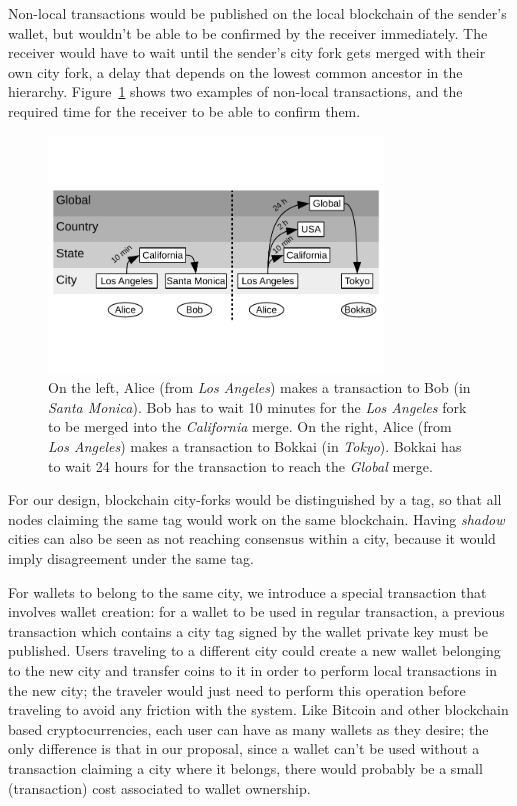 Non-local transactions would be published on the local blockchain of the
sender's wallet, but wouldn't be able to be confirmed by the receiver
immediately.  The receiver would have to wait until the sender's city fork gets
merged with their own city fork, a delay that depends on the lowest common
ancestor in the hierarchy.  Figure~\ref{fig:non-local-tx} shows two examples of
non-local transactions, and the required time for the receiver to be able to
confirm them.

\begin{figure}
\includegraphics[trim={0 0.8in 0 0.4in},clip,width=3.5in]{non-local-tx}
\caption{On the left, Alice (from \textit{Los Angeles}) makes a transaction to
Bob (in \textit{Santa Monica}).  Bob has to wait 10 minutes for the \textit{Los
Angeles} fork to be merged into the \textit{California} merge.  On the right,
Alice (from \textit{Los Angeles}) makes a transaction to Bokkai (in
\textit{Tokyo}).  Bokkai has to wait 24 hours for the transaction to reach the
\textit{Global} merge.}
\label{fig:non-local-tx}
\end{figure}

For our design, blockchain city-forks would be distinguished by a tag, so that
all nodes claiming the same tag would work on the same blockchain.  Having
\textit{shadow} cities can also be seen as not reaching consensus within a city,
because it would imply disagreement under the same tag.

For wallets to belong to the same city, we introduce a special transaction that
involves wallet creation: for a wallet to be used in regular transaction, a
previous transaction which contains a city tag signed by the wallet private key
must be published.  Users traveling to a different city could create a new
wallet belonging to the new city and transfer coins to it in order to perform
local transactions in the new city; the traveler would just need to perform
this operation before traveling to avoid any friction with the system.  Like
Bitcoin and other blockchain based cryptocurrencies, each user can have as many
wallets as they desire; the only difference is that in our proposal, since a
wallet can't be used without a transaction claiming a city where it belongs,
there would probably be a small (transaction) cost associated to wallet
ownership.

